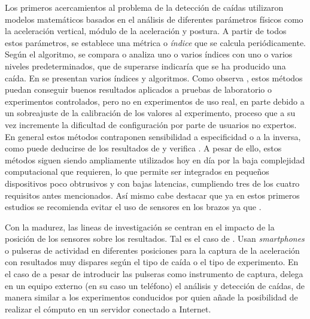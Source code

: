 Los primeros acercamientos\cite{Williams1998,fallindex00,Chen2005,Kangas2008} al problema de la detección de caídas utilizaron modelos matemáticos basados en el análisis de diferentes parámetros físicos como la aceleración vertical, módulo de la aceleración y postura. A partir de todos estos parámetros, se establece una métrica o \textit{índice} que se calcula periódicamente. Según el algoritmo, se compara o analiza uno o varios índices con uno o varios niveles predeterminados, que de superarse indicaría que se ha producido una caída\cite{Luque2014}. En  se presentan varios índices y algoritmos. Como observa , estos métodos puedan conseguir buenos resultados aplicados a pruebas de laboratorio o experimentos controlados, pero no en experimentos de uso real, en parte debido a un sobreajuste de la calibración de los valores al experimento, proceso que a su vez incremente la dificultad de configuración por parte de usuarios no expertos\cite{Kangas2008, Luque2014}. En general estos métodos contraponen sensibilidad a especificidad o a la inversa, como puede deducirse de los resultados de  y verifica . A pesar de ello, estos métodos siguen siendo ampliamente utilizados hoy en día por la baja complejidad computacional que requieren, lo que permite ser integrados en pequeños dispositivos poco obtrusivos y con bajas latencias, cumpliendo tres de los cuatro requisitos antes mencionados. Así mismo cabe destacar que ya en estos primeros estudios se recomienda evitar el uso de sensores en los brazos ya que .

Con la madurez, las lineas de investigación se centran en el impacto de la posición de los sensores sobre los resultados. Tal es el caso de . Usan \textit{smartphones} o pulseras de actividad en diferentes posiciones para la captura de la aceleración con resultados muy dispares según el tipo de caída o el tipo de experimento. En el caso de  a pesar de introducir las pulseras como instrumento de captura, delega en un equipo externo (en su caso un teléfono) el análisis y detección de caídas, de manera similar a los experimentos conducidos por  quien añade la posibilidad de realizar el cómputo en un servidor conectado a Internet.

